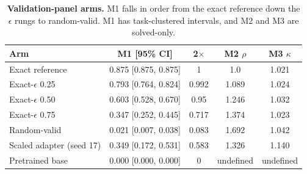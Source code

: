 \begin{table}[t]
\caption{\textbf{Validation-panel arms.} M1 falls in order from the exact reference down the $\epsilon$ rungs to random-valid. M1 has task-clustered intervals, and M2 and M3 are solved-only.}
\label{tab:appendix-ladder-arms}
\centering\footnotesize
\setlength{\tabcolsep}{2.5pt}
\begin{tabular}{lcccc}
\toprule[0.4mm]
\rowcolor{mygray}\textbf{Arm} & \textbf{M1 [95\% CI]} & \textbf{2$\times$} & \textbf{M2 $\rho$} & \textbf{M3 $\kappa$} \\
\midrule
Exact reference & 0.875 [0.875, 0.875] & 1 & 1.0 & 1.021 \\
Exact-$\epsilon$ 0.25 & 0.793 [0.764, 0.824] & 0.992 & 1.089 & 1.024 \\
Exact-$\epsilon$ 0.50 & 0.603 [0.528, 0.670] & 0.95 & 1.246 & 1.032 \\
Exact-$\epsilon$ 0.75 & 0.347 [0.252, 0.445] & 0.717 & 1.374 & 1.023 \\
Random-valid & 0.021 [0.007, 0.038] & 0.083 & 1.692 & 1.042 \\
\midrule
Scaled adapter (seed 17) & 0.349 [0.172, 0.531] & 0.583 & 1.326 & 1.140 \\
Pretrained base & 0.000 [0.000, 0.000] & 0 & undefined & undefined \\
\bottomrule
\end{tabular}
\end{table}

